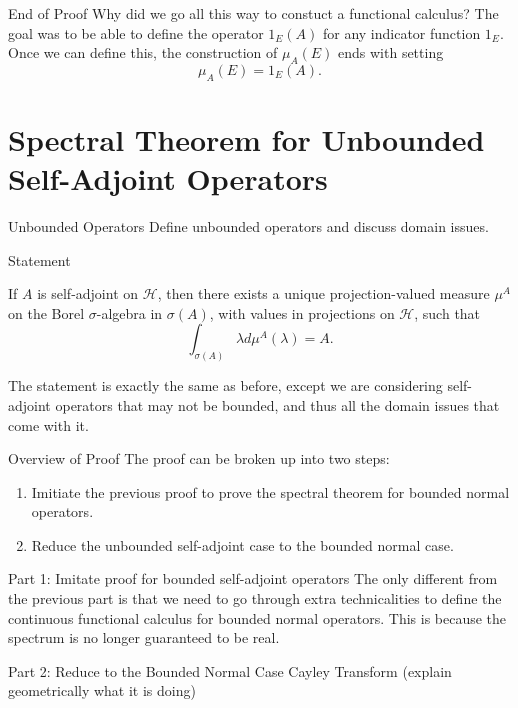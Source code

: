 \documentclass{beamer}
\theoremstyle{plain}
\theoremstyle{definition}
\renewcommand{\l}{\lambda}
\newcommand{\s}{\sigma}
\newcommand{\cH}{{\mathcal H}}
\begin{document}
\begin{frame}{End of Proof}
    Why did we go all this way to constuct a functional calculus? The goal was to be able to define the operator $1_E(A)$ for any indicator function $1_E$. Once we can define this, the construction of $\mu_A(E)$ ends with setting
    \[
        \mu_A(E) = 1_E(A).
    \]
\end{frame}

\section{Spectral Theorem for Unbounded Self-Adjoint Operators}

\begin{frame}{Unbounded Operators}
    Define unbounded operators and discuss domain issues.
\end{frame}

\begin{frame}{Statement}
    \begin{theorem}
        If $A$ is self-adjoint on $\cH$, then there exists a unique projection-valued measure $\mu^A$ on the Borel $\s$-algebra in $\s(A)$, with values in projections on $\cH$, such that
        \[
            \int_{\s(A)} \l d\mu^A(\l) = A.
        \]
    \end{theorem}
    \medskip
    The statement is exactly the same as before, except we are considering self-adjoint operators that may not be bounded, and thus all the domain issues that come with it.
\end{frame}

\begin{frame}{Overview of Proof}
    The proof can be broken up into two steps:
    \begin{enumerate}
        \item Imitiate the previous proof to prove the spectral theorem for bounded normal operators.
        \item Reduce the unbounded self-adjoint case to the bounded normal case.
    \end{enumerate}
\end{frame}

\begin{frame}{Part 1: Imitate proof for bounded self-adjoint operators}
    The only different from the previous part is that we need to go through extra technicalities to define the continuous functional calculus for bounded normal operators. This is because the spectrum is no longer guaranteed to be real.
\end{frame}

\begin{frame}{Part 2: Reduce to the Bounded Normal Case}
    Cayley Transform (explain geometrically what it is doing)
\end{frame}
\end{document}
